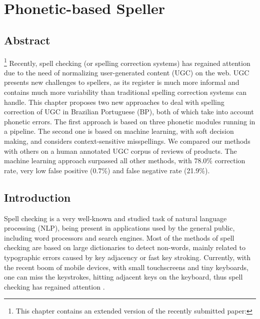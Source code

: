 \chapter{Phonetic-based Speller}\label{ch:speller}

\section*{Abstract}
\footnote{This chapter contains an extended version of the recently submitted paper: }
Recently, spell checking (or spelling correction systems) has regained attention 
due to the need of normalizing user-generated content (UGC) on the web. UGC presents 
new challenges to spellers, as its register is much more informal and contains much
more variability than traditional spelling correction systems can handle. This chapter proposes 
two new approaches to deal with spelling correction of UGC in Brazilian Portuguese (BP), 
both of which take into account phonetic errors. The first approach is based on three phonetic
modules running in a pipeline. The second one is based on machine learning, with soft decision 
making, and considers context-sensitive misspellings. We compared our methods with 
others on a human annotated UGC corpus of reviews of products. The machine learning approach surpassed 
all other methods, with 78.0\% correction rate, very low false positive (0.7\%) and false 
negative rate (21.9\%). 

\section{Introduction}

Spell checking is a very well-known and studied task of natural language processing (NLP), being present in applications used by the general public, including word processors and search engines. Most of the methods of spell checking are based on large dictionaries to detect non-words, mainly related to typographic errors caused by key adjacency or fast key stroking. 
Currently, with the recent boom of mobile devices, with small touchscreens and tiny keyboards, one can miss the keystrokes, hitting adjacent keys on the keyboard, thus spell checking has regained attention \cite{Duan2011}.   

